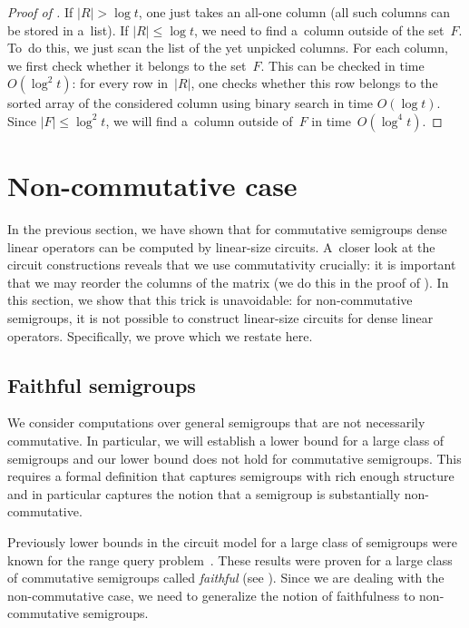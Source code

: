 \documentclass{toc}
\begin{document}
\begin{proof}[Proof of {}]
    If $|R| > \log t$, one just takes an all-one column (all such columns
    can be stored in a~list). If $|R| \le \log t$, we need to find a~column outside
    of the set~$F$. To~do this, we just scan the list of the yet unpicked columns. For
    each column, we first check whether it belongs to the set~$F$. This can be
    checked in time $O(\log^2t)$: for every row in~$|R|$, one checks whether this
    row belongs to the sorted array of the considered column using binary search in
    time $O(\log t)$. Since $|F| \le \log^2t$, we will find a~column outside of~$F$
    in time~$O(\log^4 t)$.

\end{proof}


\section{Non-commutative case}
\label{sec-non-commutative}

In the previous section, we have shown that for commutative semigroups dense
linear operators can be computed by linear-size circuits. A~closer look at the
circuit constructions reveals that we use commutativity crucially: it is
important that we may reorder the columns of the matrix (we do this in the proof
of ). In this section, we show that this trick is
unavoidable: for non-commutative semigroups, it is not possible to construct
linear-size circuits for dense linear operators. %
Specifically,  %
we prove 
which we restate here.  %

\lowerthm*

\subsection{Faithful semigroups}

We consider computations over general semigroups that are not necessarily
commutative. In particular, we will establish a lower bound for a large class of
semigroups and our lower bound does not hold for commutative semigroups. This
requires a formal definition that captures semigroups with rich enough structure
and in particular %
captures the notion   %
that a semigroup is substantially non-commutative.

Previously lower bounds in the circuit model for a large class of semigroups
were known for 
the range query
problem~\cite{DBLP:conf/stoc/Yao82,DBLP:journals/ijcga/ChazelleR91}. These
results were proven for a large class of commutative semigroups called
\emph{faithful} (see ). Since we are dealing
with the non-commutative case, we need to generalize the notion of faithfulness
to non-commutative semigroups.
\end{document}
